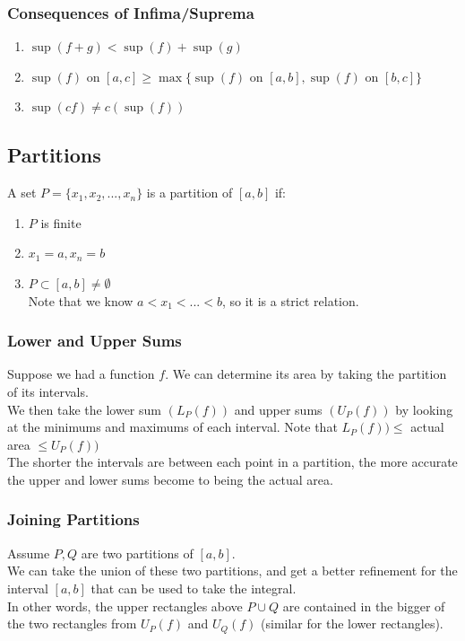 \documentclass{article}
\begin{document}
\subsubsection{Consequences of Infima/Suprema}
\begin{enumerate}
    \item $\sup(f+g) < \sup(f) + \sup(g)$
    \item $\sup(f)$ on $[a,c] \geq \max\{\sup(f)$ on $[a,b], \sup(f)$ on $[b,c]\}$
    \item $\sup(cf) \neq c(\sup(f))$
\end{enumerate}
\subsection{Partitions}
A set $P = \{x_1, x_2, ..., x_n\}$ is a partition of $[a,b]$ if:
\begin{enumerate}
    \item $P$ is finite
    \item $x_1 = a, x_n = b$
    \item $P \subset [a,b] \neq \emptyset$\\
    Note that we know $a < x_1 < ... < b$, so it is a strict relation.
\end{enumerate}

\subsubsection{Lower and Upper Sums}
Suppose we had a function $f$. We can determine its area by taking the partition of its intervals.\\
We then take the lower sum $(L_P(f))$ and upper sums $(U_P(f))$ by looking at the minimums and maximums of each interval. Note that $L_P(f)) \leq$ actual area $\leq U_P(f))$\\
The shorter the intervals are between each point in a partition, the more accurate the upper and lower sums become to being the actual area.

\subsubsection{Joining Partitions}
Assume $P, Q$ are two partitions of $[a,b]$.\\
We can take the union of these two partitions, and get a better refinement for the interval $[a,b]$ that can be used to take the integral.\\
In other words, the upper rectangles above $P \cup Q$ are contained in the bigger of the two rectangles from $U_{P}(f)$ and $U_Q(f)$ (similar for the lower rectangles).
\end{document}

